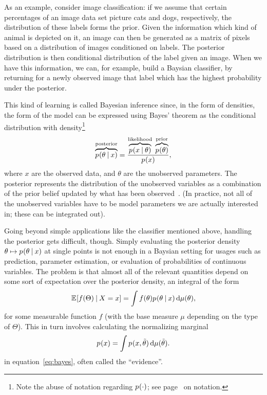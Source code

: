 As an example, consider image classification: if we assume that certain percentages of an image data
set picture cats and dogs, respectively, the distribution of these labels forms the prior.  Given
the information which kind of animal is depicted on it, an image can then be generated as a matrix
of pixels based on a distribution of images conditioned on labels.  The posterior distribution is
then conditional distribution of the label given an image.  When we have this information, we can,
for example, build a Baysian classifier, by returning for a newly observed image that label which
has the highest probability under the posterior.

This kind of learning is called Bayesian inference since, in the form of densities, the form of the
model can be expressed using Bayes' theorem as the conditional distribution with
density\footnote{Note the abuse of notation regarding \(\prob{\cdot}\); see
  page~\pageref{cha:notation} on notation.}
\begin{equation}
  \label{eq:bayes}
  \overbrace{\prob{\theta \given x}}^{\text{posterior}} =
  \frac{\overbrace{\prob{x \given \theta}}^{\text{likelihood}}\;
    \overbrace{\prob{\theta}}^{\text{prior}}}{\prob{x}},
\end{equation}
where \(x\) are the observed data, and \(\theta\) are the unobserved parameters. The posterior
represents the distribution of the unobserved variables as a combination of the prior belief updated
by what has been observed~\parencite{congdon2006bayesian}.  (In practice, not all of the unobserved
variables have to be model parameters we are actually interested in; these can be integrated out).

Going beyond simple applications like the classifier mentioned above, handling the posterior gets
difficult, though.  Simply evaluating the posterior density
\(\theta \mapsto \prob{\theta \given x}\) at single points is not enough in a Baysian setting for
usages such as prediction, parameter estimation, or evaluation of probabilities of continuous
variables.  The problem is that almost all of the relevant quantities depend on some sort of
expectation over the posterior density, an integral of the form
\begin{equation}
  \label{eq:posterior-expectation}
  \Exp{f(\Theta) \given X = x} = \int f(\theta) \prob{\theta \given x} \dif \mu(\theta),
\end{equation}
for some measurable function \(f\) (with the base measure \(\mu\) depending on the type of
\(\Theta\)). This in turn involves calculating the normalizing marginal
\begin{equation}
  \label{eq:normalizing}
  \prob{x} = \int \prob{x, \tilde{\theta}} \dif \mu(\tilde{\theta}).
\end{equation}
in equation~\ref{eq:bayes}, often called the \enquote{evidence}.

